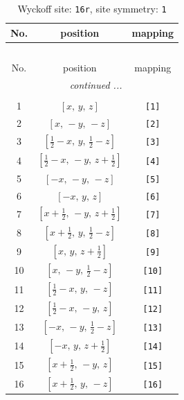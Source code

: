 \documentclass[fleqn,8pt]{jsarticle}
\begin{document}
\begin{longtable}{ccc}
\caption{Wyckoff site: {\tt 16r}, site symmetry: {\tt 1}}
 \\
 \hline \hline
No. & position & mapping \\ \hline \endfirsthead

\multicolumn{2}{l}{\tablename\ \thetable{}} \\
 \hline \hline
No. & position & mapping \\ \hline \endhead

 \hline \hline
\multicolumn{2}{r}{\footnotesize\it continued ...} \\ \endfoot

 \hline \hline
\multicolumn{2}{r}{} \\ \endlastfoot

1 & $\left[ x,\, y,\, z \right]$ & {\tt [1]} \\ \hline
2 & $\left[ x,\, - y,\, - z \right]$ & {\tt [2]} \\ \hline
3 & $\left[ \frac{1}{2} - x,\, y,\, \frac{1}{2} - z \right]$ & {\tt [3]} \\ \hline
4 & $\left[ \frac{1}{2} - x,\, - y,\, z + \frac{1}{2} \right]$ & {\tt [4]} \\ \hline
5 & $\left[ - x,\, - y,\, - z \right]$ & {\tt [5]} \\ \hline
6 & $\left[ - x,\, y,\, z \right]$ & {\tt [6]} \\ \hline
7 & $\left[ x + \frac{1}{2},\, - y,\, z + \frac{1}{2} \right]$ & {\tt [7]} \\ \hline
8 & $\left[ x + \frac{1}{2},\, y,\, \frac{1}{2} - z \right]$ & {\tt [8]} \\ \hline
9 & $\left[ x,\, y,\, z + \frac{1}{2} \right]$ & {\tt [9]} \\ \hline
10 & $\left[ x,\, - y,\, \frac{1}{2} - z \right]$ & {\tt [10]} \\ \hline
11 & $\left[ \frac{1}{2} - x,\, y,\, - z \right]$ & {\tt [11]} \\ \hline
12 & $\left[ \frac{1}{2} - x,\, - y,\, z \right]$ & {\tt [12]} \\ \hline
13 & $\left[ - x,\, - y,\, \frac{1}{2} - z \right]$ & {\tt [13]} \\ \hline
14 & $\left[ - x,\, y,\, z + \frac{1}{2} \right]$ & {\tt [14]} \\ \hline
15 & $\left[ x + \frac{1}{2},\, - y,\, z \right]$ & {\tt [15]} \\ \hline
16 & $\left[ x + \frac{1}{2},\, y,\, - z \right]$ & {\tt [16]} \\
\end{longtable}
\end{document}
